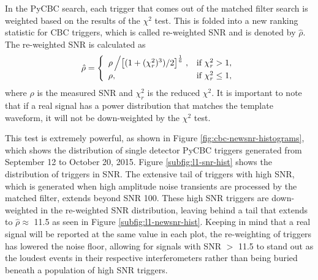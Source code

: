 In the PyCBC search, each trigger that comes out of the matched filter search is 
weighted based on the results of
the $\chi^{2}$ test. This is folded into a new ranking statistic for CBC triggers,
which is called re-weighted SNR and is denoted by $\hat{\rho}$.
The re-weighted SNR is calculated as \cite{Usman:2015kfa} 
\begin{equation}
\hat{\rho} = \left\{\begin{array}{lr}
\rho\left/\left[(1+(\chi^2_r)^3)/2\right]^\frac{1}{6}\right., & \text{if } \chi_r^2 > 1, \\
\rho, & \text{if } \chi_r^2 \le 1,
\label{eq:reweighted}
\end{array}\right.
\end{equation}
where $\rho$ is the measured SNR and $\chi^2_r$ is the reduced $\chi^2$.
It is important to note that if a real signal has a power
distribution that matches the template waveform, it will not be
down-weighted by the $\chi^{2}$ test.  

This test is extremely powerful, as shown in Figure \ref{fig:cbc-newsnr-histograms}, 
which shows the distribution of single detector PyCBC triggers generated from 
September 12 to October 20, 2015. 
Figure \ref{subfig:l1-snr-hist} shows the distribution of triggers in SNR. 
The extensive tail of
triggers with high SNR, which is generated when high amplitude noise transients 
are processed by the matched filter, extends beyond SNR 100. 
These high SNR triggers are down-weighted in the re-weighted SNR distribution,
leaving behind a tail that extends to $\hat{\rho} \approx$ 11.5 as seen in Figure 
\ref{subfig:l1-newsnr-hist}. Keeping in mind that a real signal will be reported 
at the same value in each plot, the re-weighting of triggers has lowered the 
noise floor, allowing for signals with SNR $>$ 11.5 to stand out as the 
loudest events in their respective interferometers rather than being buried 
beneath a population of high SNR triggers.  

